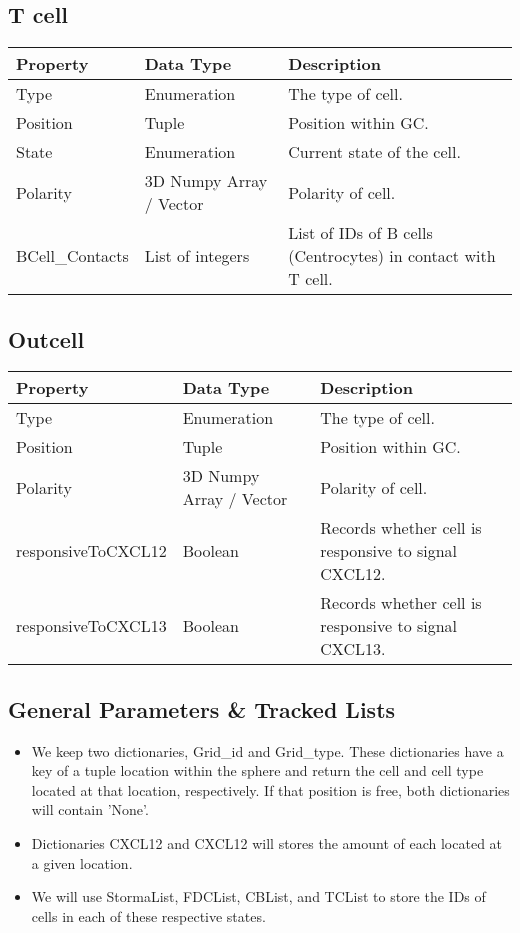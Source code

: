 \documentclass[english]{article}
\begin{document}
\subsection{T cell}
\begin{center}
\begin{tabular}{|C{2.1in}|C{2.1in}|C{2.1in}|}
\hline
\textbf{Property} & \textbf{Data Type} & \textbf{Description}
\tabularnewline
\hline
\hline
Type & Enumeration & The type of cell. 
\tabularnewline
\hline
Position & Tuple & Position within GC.
\tabularnewline
\hline
State & Enumeration & Current state of the cell.
\tabularnewline
\hline
Polarity & 3D Numpy Array / Vector & Polarity of cell.
\tabularnewline
\hline
BCell\_Contacts & List of integers & List of IDs of B cells (Centrocytes) in contact with T cell. 
\tabularnewline
\hline

\end{tabular}
\end{center}

\subsection{Outcell}
\begin{center}
\begin{tabular}{|C{2.1in}|C{2.1in}|C{2.1in}|}
\hline
\textbf{Property} & \textbf{Data Type} & \textbf{Description}
\tabularnewline
\hline
\hline
Type & Enumeration & The type of cell. 
\tabularnewline
\hline
Position & Tuple & Position within GC.
\tabularnewline
\hline
Polarity & 3D Numpy Array / Vector & Polarity of cell.
\tabularnewline
\hline
responsiveToCXCL12 & Boolean & Records whether cell is responsive to signal CXCL12.
\tabularnewline
\hline
responsiveToCXCL13 & Boolean & Records whether cell is responsive to signal CXCL13.
\tabularnewline
\hline

\end{tabular}
\end{center}


\subsection{General Parameters \& Tracked Lists}
\begin{itemize}

\item We keep two dictionaries, Grid\_id and Grid\_type. These dictionaries have a key of a tuple location within the sphere and return the cell and cell type located at that location, respectively. If that position is free, both dictionaries will contain 'None'.

\item Dictionaries CXCL12 and CXCL12 will stores the amount of each located at a given location. 

\item We will use StormaList, FDCList, CBList, and TCList to store the IDs of cells in each of these respective states. 

\end{itemize}
\end{document}
